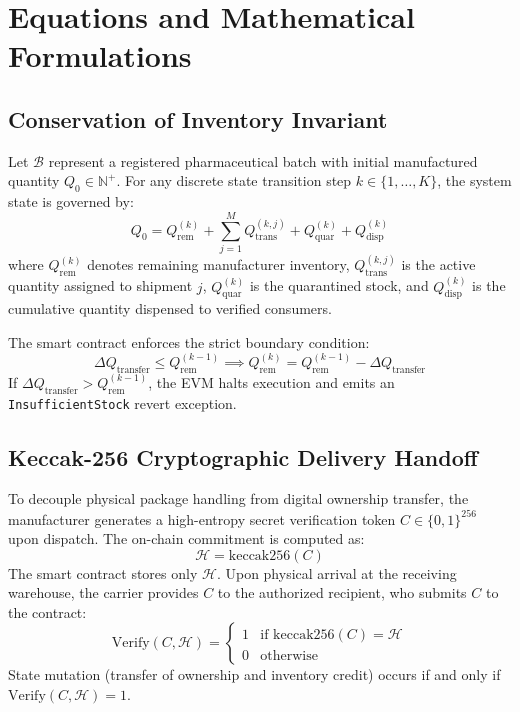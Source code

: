 \documentclass[11pt,a4paper]{article}
\begin{document}
\section{Equations and Mathematical Formulations}

\subsection{Conservation of Inventory Invariant}
Let $\mathcal{B}$ represent a registered pharmaceutical batch with initial manufactured quantity $Q_0 \in \mathbb{N}^+$. For any discrete state transition step $k \in \{1, \dots, K\}$, the system state is governed by:
\begin{equation}
Q_0 = Q_{\text{rem}}^{(k)} + \sum_{j=1}^{M} Q_{\text{trans}}^{(k,j)} + Q_{\text{quar}}^{(k)} + Q_{\text{disp}}^{(k)}
\label{eq:conservation}
\end{equation}
where $Q_{\text{rem}}^{(k)}$ denotes remaining manufacturer inventory, $Q_{\text{trans}}^{(k,j)}$ is the active quantity assigned to shipment $j$, $Q_{\text{quar}}^{(k)}$ is the quarantined stock, and $Q_{\text{disp}}^{(k)}$ is the cumulative quantity dispensed to verified consumers.

The smart contract enforces the strict boundary condition:
\begin{equation}
\Delta Q_{\text{transfer}} \le Q_{\text{rem}}^{(k-1)} \implies Q_{\text{rem}}^{(k)} = Q_{\text{rem}}^{(k-1)} - \Delta Q_{\text{transfer}}
\label{eq:boundary}
\end{equation}
If $\Delta Q_{\text{transfer}} > Q_{\text{rem}}^{(k-1)}$, the EVM halts execution and emits an \texttt{InsufficientStock} revert exception.

\subsection{Keccak-256 Cryptographic Delivery Handoff}
To decouple physical package handling from digital ownership transfer, the manufacturer generates a high-entropy secret verification token $C \in \{0,1\}^{256}$ upon dispatch. The on-chain commitment is computed as:
\begin{equation}
\mathcal{H} = \text{keccak256}(C)
\label{eq:hash}
\end{equation}
The smart contract stores only $\mathcal{H}$. Upon physical arrival at the receiving warehouse, the carrier provides $C$ to the authorized recipient, who submits $C$ to the contract:
\begin{equation}
\text{Verify}(C, \mathcal{H}) = 
\begin{cases} 
1 & \text{if } \text{keccak256}(C) = \mathcal{H} \\ 
0 & \text{otherwise} 
\end{cases}
\label{eq:verify}
\end{equation}
State mutation (transfer of ownership and inventory credit) occurs if and only if $\text{Verify}(C, \mathcal{H}) = 1$.
\end{document}
